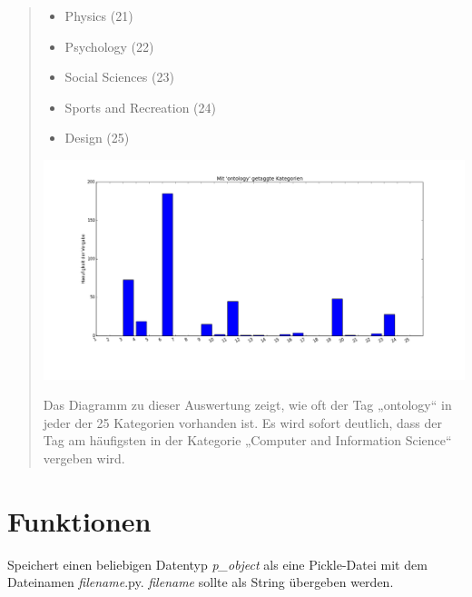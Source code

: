 \documentclass[letterpaper,10pt,english]{sphinxmanual}
\begin{document}
\begin{quote}
\begin{itemize}
\item {} 
Physics (21)

\item {} 
Psychology (22)

\item {} 
Social Sciences (23)

\item {} 
Sports and Recreation (24)

\item {} 
Design (25)

\end{itemize}

\includegraphics{ontology.png}

Das Diagramm zu dieser Auswertung zeigt, wie oft der Tag „ontology“ in jeder der 25 Kategorien vorhanden ist. Es wird sofort deutlich, dass der Tag am häufigsten in der Kategorie „Computer and Information Science“ vergeben wird.
\end{quote}


\section{Funktionen}
\label{project_3:funktionen}

\begin{fulllineitems}
\label{project_3:project_3.save_as_pickle}
Speichert einen beliebigen Datentyp \emph{p\_object} als eine Pickle-Datei mit dem Dateinamen \emph{filename}.py. \emph{filename} sollte als String übergeben werden.

\end{fulllineitems}

\end{document}

